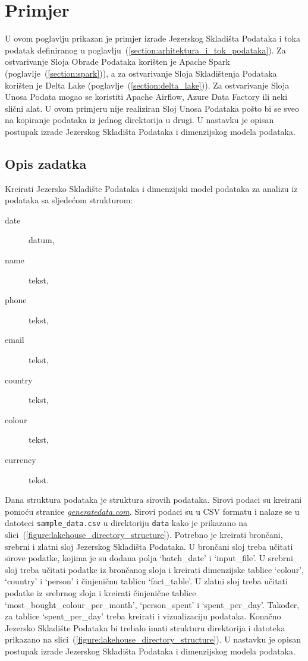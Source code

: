 \chapter{Primjer} \label{chapter:primjer}

U ovom poglavlju prikazan je primjer izrade Jezerskog Skladišta Podataka i toka
podatak definiranog u poglavlju~(\ref{section:arhitektura_i_tok_podataka}). Za
ostvarivanje Sloja Obrade Podataka korišten je Apache Spark
(poglavlje~(\ref{section:spark})), a za ostvarivanje Sloja Skladištenja Podataka
korišten je Delta Lake (poglavlje~(\ref{section:delta_lake})). Za ostvarivanje
Sloja Unosa Podata mogao se koristiti Apache Airflow, Azure Data Factory ili
neki slični alat. U ovom primjeru nije realiziran Sloj Unosa Podataka pošto bi
se sveo na kopiranje podataka iz jednog direktorija u drugi. U nastavku je
opisan postupak izrade Jezerskog Skladišta Podataka i dimenzijskog modela
podataka.

\section{Opis zadatka} \label{section:opis_zadatka}

Kreirati Jezersko Skladište Podataka i dimenzijski model podataka za analizu
iz podataka sa sljedećom strukturom:
\begin{description}
    \item[date] datum,
    \item[name] tekst,
    \item[phone] tekst,
    \item[email] tekst,
    \item[country] tekst,
    \item[colour] tekst,
    \item[currency] tekst.      
\end{description}
Dana struktura podataka je struktura sirovih podataka. Sirovi podaci su kreirani
pomoću stranice \href{https://generatedata.com/}{\textit{generatedata.com}}. Sirovi
podaci su u CSV formatu i nalaze se u datoteci \texttt{sample\_data.csv} u
direktoriju \texttt{data} kako je prikazano na
slici~(\ref{figure:lakehouse_directory_structure}). Potrebno je kreirati
brončani, srebrni i zlatni sloj Jezerskog Skladišta Podataka. U brončani sloj
treba učitati sirove podatke, kojima je su dodana polja `batch\_date' i
`input\_file'. U srebrni sloj treba učitati podatke iz brončanog sloja i
kreirati dimenzijske tablice `colour', `country' i `person' i činjeničnu
tablicu `fact\_table'. U zlatni sloj treba učitati podatke iz srebrnog sloja i
kreirati činjenične tablice `most\_bought\_colour\_per\_month', `person\_spent'
i `spent\_per\_day'. Također, za tablice `spent\_per\_day' treba kreirati i
vizualizaciju podataka. Konačno Jezersko Skladište Podataka bi trebalo imati
strukturu direktorija i datoteka prikazano na
slici~(\ref{figure:lakehouse_directory_structure}). U nastavku je opisan
postupak izrade Jezerskog Skladišta Podataka i dimenzijskog modela podataka.


